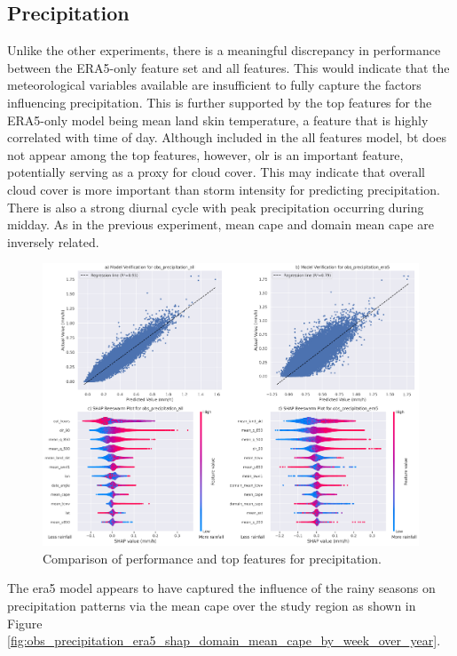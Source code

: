 \clearpage
\subsection{Precipitation}

Unlike the other experiments, there is a meaningful discrepancy in performance between the ERA5-only feature set and all features. This would indicate that the meteorological variables available are insufficient to fully capture the factors influencing precipitation. This is further supported by the top features for the ERA5-only model being mean land skin temperature, a feature that is highly correlated with time of day. Although included in the all features model, \acrfull{bt} does not appear among the top features, however, \acrfull{olr} is an important feature, potentially serving as a proxy for cloud cover. This may indicate that overall cloud cover is more important than storm intensity for predicting precipitation. There is also a strong diurnal cycle with peak precipitation occurring during midday. As in the previous experiment, mean \acrshort{cape} and domain mean \acrshort{cape} are inversely related.

\begin{figure}[ht]
    \centering
    \includegraphics[width=\textwidth]{../figures/generated/experiments/obs_precipitation/obs_precipitation_summary.png}
    \caption{Comparison of performance and top features for precipitation.}
    \label{fig:obs_precipitation_summary}
\end{figure}

The \acrshort{era5} model appears to have captured the influence of the rainy seasons  on precipitation patterns via the mean \acrshort{cape} over the study region as shown in Figure \ref{fig:obs_precipitation_era5_shap_domain_mean_cape_by_week_over_year}.

